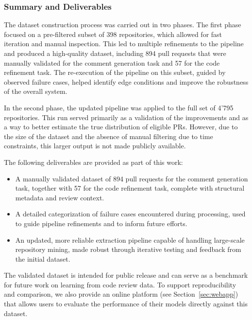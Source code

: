 \subsubsection{Summary and Deliverables}

The dataset construction process was carried out in two phases. The first phase focused on a
pre-filtered subset of 398 repositories, which allowed for fast iteration and manual inspection.
This led to multiple refinements to the pipeline and produced a high-quality dataset, including 894
pull requests that were manually validated for the comment generation task and 57 for the code
refinement task. The re-execution of the pipeline on this subset, guided by observed failure cases,
helped identify edge conditions and improve the robustness of the overall system.

In the second phase, the updated pipeline was applied to the full set of 4'795 repositories. This
run served primarily as a validation of the improvements and as a way to better estimate the true
distribution of eligible PRs. However, due to the size of the dataset and the absence of manual
filtering due to time constraints, this larger output is not made publicly available.

The following deliverables are provided as part of this work:
\begin{itemize}
	\item A manually validated dataset of 894 pull requests for the comment generation task,
	      together with 57 for the code refinement task, complete with structural metadata and review context.
	\item A detailed categorization of failure cases encountered during processing, used to guide
	      pipeline refinements and to inform future efforts.
	\item An updated, more reliable extraction pipeline capable of handling large-scale repository
	      mining, made robust through iterative testing and feedback from the initial dataset.
\end{itemize}

The validated dataset is intended for public release and can serve as a benchmark for future work on
learning from code review data. To support reproducibility and comparison, we also provide an online
platform (see Section~\ref{sec:webapp}) that allows users to evaluate the performance of their
models directly against this dataset.
